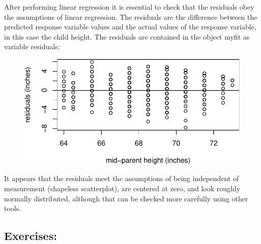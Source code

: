 \documentclass[
  letterpaper,
  DIV=11,
  numbers=noendperiod]{scrreprt}
\newenvironment{Shaded}{\begin{snugshade}}{\end{snugshade}}
\newcommand{\AttributeTok}[1]{\textcolor[rgb]{0.40,0.45,0.13}{#1}}
\newcommand{\DecValTok}[1]{\textcolor[rgb]{0.68,0.00,0.00}{#1}}
\newcommand{\FunctionTok}[1]{\textcolor[rgb]{0.28,0.35,0.67}{#1}}
\newcommand{\NormalTok}[1]{\textcolor[rgb]{0.00,0.23,0.31}{#1}}
\newcommand{\SpecialCharTok}[1]{\textcolor[rgb]{0.37,0.37,0.37}{#1}}
\newcommand{\StringTok}[1]{\textcolor[rgb]{0.13,0.47,0.30}{#1}}
\begin{document}
After performing linear regression it is essential to check that the
residuals obey the assumptions of linear regression. The residuals are
the difference between the predicted response variable values and the
actual values of the response variable, in this case the child height.
The residuals are contained in the object myfit as variable residuals:

\begin{Shaded}
\end{Shaded}

\begin{figure}[H]

{\centering \includegraphics{./linreg_files/figure-pdf/unnamed-chunk-4-1.pdf}

}

\end{figure}

It appears that the residuals meet the assumptions of being independent
of measurement (shapeless scatterplot), are centered at zero, and look
roughly normally distributed, although that can be checked more
carefully using other tools.

\hypertarget{exercises-13}{%
\subsection{Exercises:}\label{exercises-13}}
\end{document}
